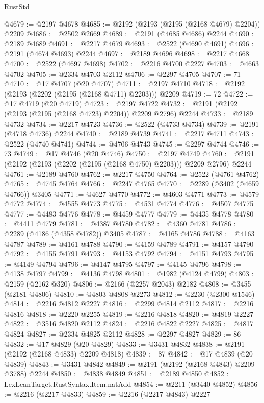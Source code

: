 \begin{lexlean}{RustStd}
\begin{coremodule}
@4679 := @2197 @4678
@4685 := @2192 (@2193 (@2195 (@2168 @4679) @2204)) @2209
@4686 := @2502 @2669
@4689 := @2191 (@4685 @4686) @2244
@4690 := @2189 @4689
@4691 := @2217 @4679
@4693 := @2522 (@4690 @4691)
@4696 := @2191 (@4674 @4693) @2244
@4697 := @2189 @4696
@4698 := @2217 @4668
@4700 := @2522 (@4697 @4698)
@4702 := @2216 @4700 @2227
@4703 := @4663 @4702
@4705 := @2334 @4703 @2112
@4706 := @2297 @4705
@4707 := 71
@4710 := @17 @4707 (@20 @4707)
@4711 := @2197 @4710
@4718 := @2192 (@2193 (@2202 (@2195 (@2168 @4711) @2203))) @2209
@4719 := 72
@4722 := @17 @4719 (@20 @4719)
@4723 := @2197 @4722
@4732 := @2191 (@2192 (@2193 (@2195 (@2168 @4723) @2204)) @2209 @2796) @2244
@4733 := @2189 @4732
@4734 := @2217 @4723
@4736 := @2522 (@4733 @4734)
@4739 := @2191 (@4718 @4736) @2244
@4740 := @2189 @4739
@4741 := @2217 @4711
@4743 := @2522 (@4740 @4741)
@4744 := @4706 @4743
@4745 := @2297 @4744
@4746 := 73
@4749 := @17 @4746 (@20 @4746)
@4750 := @2197 @4749
@4760 := @2191 (@2192 (@2193 (@2202 (@2195 (@2168 @4750) @2203))) @2209 @2796) @2244
@4761 := @2189 @4760
@4762 := @2217 @4750
@4764 := @2522 (@4761 @4762)
@4765 := @4745 @4764
@4766 := @2247 @4765
@4770 := @2289 (@3402 (@4659 @4766)) @3405
@4771 := @4627 @4770
@4772 := @4603 @4771
@4773 := @4579 @4772
@4774 := @4555 @4773
@4775 := @4531 @4774
@4776 := @4507 @4775
@4777 := @4483 @4776
@4778 := @4459 @4777
@4779 := @4435 @4778
@4780 := @4411 @4779
@4781 := @4387 @4780
@4782 := @4360 @4781
@4786 := @2289 (@4186 (@4358 @4782)) @3405
@4787 := @4165 @4786
@4788 := @4163 @4787
@4789 := @4161 @4788
@4790 := @4159 @4789
@4791 := @4157 @4790
@4792 := @4155 @4791
@4793 := @4153 @4792
@4794 := @4151 @4793
@4795 := @4149 @4794
@4796 := @4147 @4795
@4797 := @4145 @4796
@4798 := @4138 @4797
@4799 := @4136 @4798
@4801 := @1982 (@4124 @4799)
@4803 := @2159 (@2162 @320)
@4806 := @2166 (@2257 @2043) @2182
@4808 := @3455 (@2181 @4806)
@4810 := @4803 @4808 @2273
@4812 := @2230 (@2300 @1546)
@4814 := @2216 @4812 @2227
@4816 := @2299 @4814 @2112
@4817 := @2216 @4816
@4818 := @2220 @2255
@4819 := @2216 @4818
@4820 := @4819 @2227
@4822 := @3516 @4820 @2112
@4824 := @2216 @4822 @2227
@4825 := @4817 @4824
@4827 := @2334 @4825 @2112
@4828 := @2297 @4827
@4829 := 86
@4832 := @17 @4829 (@20 @4829)
@4833 := @3431 @4832
@4838 := @2191 (@2192 (@2168 @4833) @2209 @4818)
@4839 := 87
@4842 := @17 @4839 (@20 @4839)
@4843 := @3431 @4842
@4849 := @2191 (@2192 (@2168 @4843) @2209 @3788) @2244
@4850 := @4838 @4849
@4851 := @2189 @4850
@4852 := LexLeanTarget.RustSyntax.Item.natAdd
@4854 := @2211 (@3440 @4852)
@4856 := @2216 (@2217 @4833)
@4859 := @2216 (@2217 @4843) @2227

\end{coremodule}
\end{lexlean}
